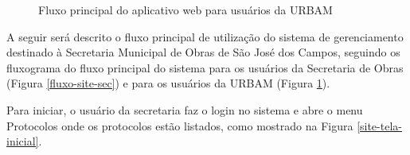 \documentclass[
	article,			%
	11pt,				%
	oneside,			%
	a4paper,			%
	english,			%
	brazil,				%
	sumario=tradicional
	]{abntex2}
\begin{document}
\begin{figure}[!htbp]
 \centering
 \caption{\label{fluxo-site-urbam}Fluxo principal do aplicativo web para usuários da URBAM}
\end{figure}

A seguir será descrito o fluxo principal de utilização do sistema de gerenciamento destinado à Secretaria Municipal de Obras de São José dos Campos, seguindo os fluxograma do fluxo principal do sistema para os usuários da Secretaria de Obras (Figura \ref{fluxo-site-sec}) e para os usuários da URBAM (Figura \ref{fluxo-site-urbam}).

Para iniciar, o usuário da secretaria faz o login no sistema e abre o menu Protocolos onde os protocolos estão listados, como mostrado na Figura \ref{site-tela-inicial}.
\end{document}

